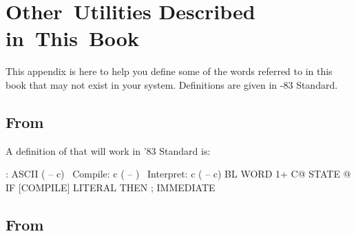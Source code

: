 \chapter{Other~Utilities Described in~This~Book}

This appendix is here to help you define some of the words referred to in
this book that may not exist in your system.  Definitions are given in
\Forth{}-83 Standard.

\section{From }

A definition of  that will work in '83
Standard is:
\begin{Code}
: ASCII  ( -- c)  \  Compile:  c  ( -- )
\ Interpret:   c   ( -- c)
     BL WORD 1+ C@  STATE @
     IF [COMPILE] LITERAL  THEN ; IMMEDIATE
\end{Code}

\section{From }

